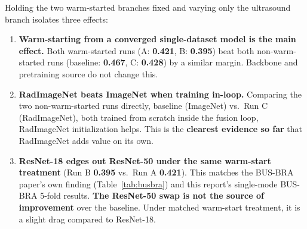 \documentclass[11pt]{article}
\begin{document}
\begin{table}[htbp]
  \centering
  \caption{Combined 3-branch fusion: varying only the ultrasound branch's backbone/initialization. Selection is by lowest validation loss, not by accuracy.}
  \label{tab:mixed-fusion}
\end{table}

Holding the two warm-started branches fixed and varying only the ultrasound
branch isolates three effects:

\begin{enumerate}
  \item \textbf{Warm-starting from a converged single-dataset model is the
    main effect.} Both warm-started runs (A: \textbf{0.421}, B:
    \textbf{0.395}) beat both non-warm-started runs (baseline:
    \textbf{0.467}, C: \textbf{0.428}) by a similar margin. Backbone and
    pretraining source do not change this.
  \item \textbf{RadImageNet beats ImageNet when training in-loop.}
    Comparing the two non-warm-started runs directly, baseline (ImageNet)
    vs.\ Run C (RadImageNet), both trained from scratch inside the fusion
    loop, RadImageNet initialization helps. This is the \textbf{clearest
    evidence so far} that RadImageNet adds value on its own.
  \item \textbf{ResNet-18 edges out ResNet-50 under the same warm-start
    treatment} (Run B \textbf{0.395} vs.\ Run A \textbf{0.421}). This
    matches the BUS-BRA paper's own finding (Table~\ref{tab:busbra}) and
    this report's single-mode BUS-BRA 5-fold results. \textbf{The
    ResNet-50 swap is not the source of improvement} over the baseline.
    Under matched warm-start treatment, it is a slight drag compared to
    ResNet-18.
\end{enumerate}
\end{document}
